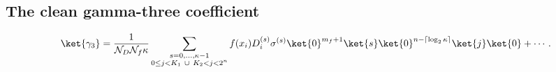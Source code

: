 \subsection*{The clean gamma-three coefficient}
\[
\ket{\gamma_3}
=
\frac{1}{\mathcal{N}_D\mathcal{N}_f\kappa}
\sum_{\substack{s=0,\ldots,\kappa-1\\
0\le j<K_1\ \cup\ K_2<j<2^n}}
f(x_i)D_i^{(s)}\sigma^{(s)}
\ket{0}^{m_f+1}\ket{s}
\ket{0}^{n-\lceil\log_2\kappa\rceil}\ket{j}\ket{0}
+\cdots.
\]





